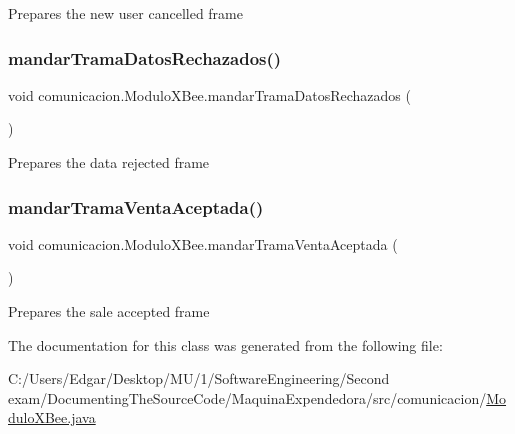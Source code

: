 Prepares the new user cancelled frame \mbox{\label{classcomunicacion_1_1_modulo_x_bee_ac996e20c06c0e1c33f868e33d13f083b}} 
\subsubsection{\texorpdfstring{mandar\+Trama\+Datos\+Rechazados()}{mandarTramaDatosRechazados()}}
{\footnotesize\ttfamily void comunicacion.\+Modulo\+X\+Bee.\+mandar\+Trama\+Datos\+Rechazados (\begin{DoxyParamCaption}{ }\end{DoxyParamCaption})\hspace{0.3cm}{\ttfamily [inline]}}

Prepares the data rejected frame \mbox{\label{classcomunicacion_1_1_modulo_x_bee_a71bbc67392676c9e0bd57813a87d06c0}} 
\subsubsection{\texorpdfstring{mandar\+Trama\+Venta\+Aceptada()}{mandarTramaVentaAceptada()}}
{\footnotesize\ttfamily void comunicacion.\+Modulo\+X\+Bee.\+mandar\+Trama\+Venta\+Aceptada (\begin{DoxyParamCaption}{ }\end{DoxyParamCaption})\hspace{0.3cm}{\ttfamily [inline]}}

Prepares the sale accepted frame 

The documentation for this class was generated from the following file\+:\begin{DoxyCompactItemize}
\item 
C\+:/\+Users/\+Edgar/\+Desktop/\+M\+U/1/\+Software\+Engineering/\+Second exam/\+Documenting\+The\+Source\+Code/\+Maquina\+Expendedora/src/comunicacion/\mbox{\hyperlink{_modulo_x_bee_8java}{Modulo\+X\+Bee.\+java}}\end{DoxyCompactItemize}
